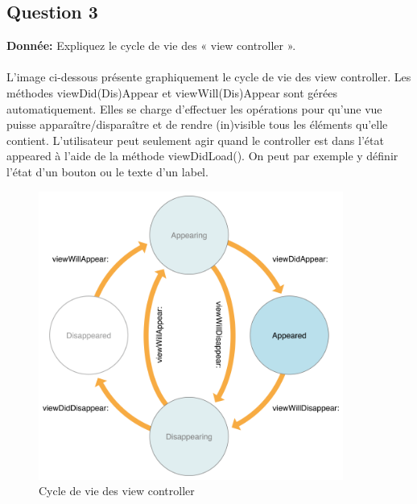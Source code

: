 \subsection{Question 3}
\textbf{Donnée: }Expliquez le cycle de vie des « view controller ».\\\\
L'image ci-dessous présente graphiquement le cycle de vie des view controller. Les méthodes viewDid(Dis)Appear et viewWill(Dis)Appear sont gérées automatiquement. Elles se charge d'effectuer les opérations pour qu'une vue puisse apparaître/disparaître et de rendre (in)visible tous les éléments qu'elle contient. L'utilisateur peut seulement agir quand le controller est dans l'état appeared à l'aide de la méthode viewDidLoad(). On peut par exemple y définir l'état d'un bouton ou le texte d'un label.
\begin{figure}[H]
	\begin{center}
		\includegraphics[width=10cm]{img/viewLife.png}
		\caption{Cycle de vie des view controller}
		\label{lifeCycle}
	\end{center}
\end{figure}
